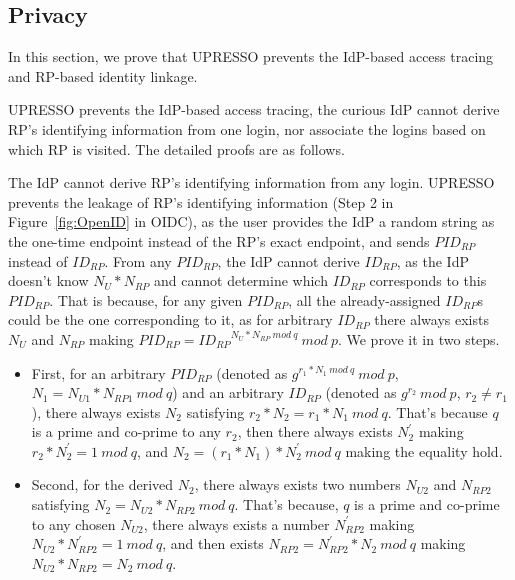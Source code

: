 \subsection{Privacy}
\label{subsec:privacy}
In this section, we prove that UPRESSO prevents the IdP-based access tracing and RP-based identity linkage.

UPRESSO prevents the IdP-based access tracing, the curious IdP cannot derive RP's identifying information from one login, nor associate the logins based on which RP is visited.
The detailed proofs are as follows.

The IdP cannot derive RP's identifying information from any login.
UPRESSO prevents the leakage of RP's identifying information (Step 2 in Figure~\ref{fig:OpenID} in OIDC), as the user provides the IdP a random string as the one-time endpoint instead of the RP's exact endpoint, and sends $PID_{RP}$ instead of $ID_{RP}$.
From any $PID_{RP}$, the IdP cannot derive $ID_{RP}$, as the IdP doesn't know $N_U*N_{RP}$ and cannot determine which $ID_{RP}$ corresponds to this $PID_{RP}$.
That is because,
for any given $PID_{RP}$, all the already-assigned $ID_{RP}$s could be the one corresponding to it,
as for arbitrary $ID_{RP}$ there always exists $N_U$ and $N_{RP}$  making $PID_{RP}={ID_{RP}}^{N_U*N_{RP}\ mod\ q} \ mod\ p$.
We prove it in two steps.
\begin{itemize}
  \item First, for an arbitrary $PID_{RP}$ (denoted  as $g^{r_1*N_1\ mod\ q}\ mod\ p$, $N_1=N_{U1}*N_{RP1}\ mod\ q$) and  an arbitrary  $ID_{RP}$ (denoted as $g^{r_2}\ mod\ p$, $r_2 \neq r_1$),  there always exists $N_2$ satisfying $r_2*N_2=r_1*N_1\ mod\ q$. That's because $q$ is a prime and co-prime to any $r_2$, then there always exists $N_2^{'}$ making $r_2*N_2^{'}=1\ mod\ q$, and $N_2=(r_1*N_1)*N_2^{'}\ mod\ q$ making the equality hold.
  \item Second, for the derived $N_2$, there always exists two numbers $N_{U2}$ and $N_{RP2}$ satisfying $N_2= N_{U2}*N_{RP2}\ mod\ q$.
That's because, $q$ is a prime and co-prime to any chosen $N_{U2}$, there always exists a number $N_{RP2}^{'}$ making $N_{U2}*N_{RP2}^{'}=1\ mod\ q$, and then exists $N_{RP2}= N_{RP2}^{'}*N_2\ mod\ q$ making $N_{U2}*N_{RP2}=N_2\ mod\ q$.
\end{itemize}



